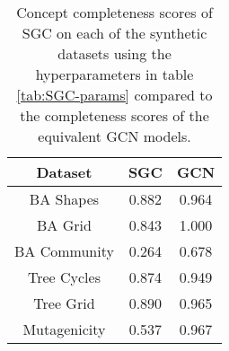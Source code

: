 \begin{table}
    \centering
    \begin{tabular}{c|c|c}
        \textbf{Dataset} &
        \textbf{SGC} &
        \textbf{GCN} \\
        \midrule
        BA Shapes       & 0.882 & 0.964 \\
        BA Grid         & 0.843 & 1.000 \\
        BA Community    & 0.264 & 0.678 \\
        Tree Cycles     & 0.874 & 0.949 \\
        Tree Grid       & 0.890 & 0.965 \\
        \midrule
        Mutagenicity    & 0.537 & 0.967 \\
    \end{tabular}
    \caption{Concept completeness scores of SGC on each of the synthetic datasets using the hyperparameters in table \ref{tab:SGC-params} compared to the completeness scores of the equivalent GCN models.}
    \label{tab:SGC-completeness}
\end{table}

